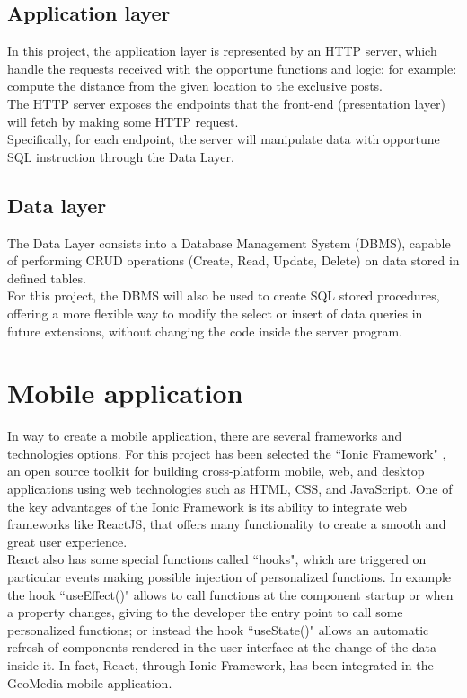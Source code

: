 \documentclass[conference]{IEEEtran}
\begin{document}
\subsection{Application layer}

In this project, the application layer is represented by an HTTP server, which handle the requests received with the opportune functions and logic; for example: compute the distance from the given location to the exclusive posts.
\\
The HTTP server exposes the endpoints that the front-end (presentation layer) will fetch by making some HTTP request.
\\
Specifically, for each endpoint, the server will manipulate data with opportune SQL instruction through the Data Layer.

\subsection{Data layer}

The Data Layer consists into a Database Management System (DBMS), capable of performing CRUD operations (Create, Read, Update, Delete) on data stored in defined tables.
\\
For this project, the DBMS will also be used to create SQL stored procedures, offering a more flexible way to modify the select or insert of data queries in future extensions, without changing the code inside the server program.


\section{Mobile application}
In way to create a mobile application, there are several frameworks and technologies options. For this project has been selected the ``Ionic Framework" \cite{b1}, an open source toolkit for building cross-platform mobile, web, and desktop applications using web technologies such as HTML, CSS, and JavaScript.
One of the key advantages of the Ionic Framework is its ability to integrate web frameworks like ReactJS, that offers many functionality to create a smooth and great user experience.
\\
React also has some special functions called ``hooks", which are triggered on particular events making possible injection of personalized functions. In example the hook ``useEffect()" allows to call functions at the component startup or when a property changes, giving to the developer the entry point to call some personalized functions; or instead the hook ``useState()" allows an automatic refresh of components rendered in the user interface at the change of the data inside it.
In fact, React, through Ionic Framework, has been integrated in the GeoMedia mobile application.
\end{document}
